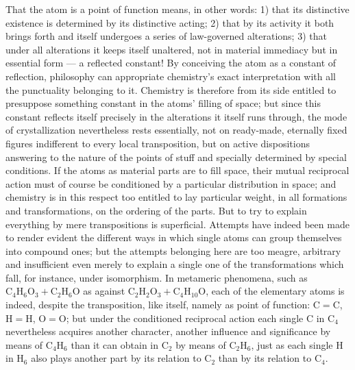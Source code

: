 \documentclass[12pt,a4paper]{book}
\begin{document}
That the atom is a point of function means, in other words: 1) that its
distinctive existence is determined by its distinctive acting; 2) that by its
activity it both brings forth and itself undergoes a series of law-governed
alterations; 3) that under all alterations it keeps itself unaltered, not in
material immediacy but in essential form --- a reflected constant! By
conceiving the atom as a constant of reflection, philosophy can appropriate
chemistry's exact interpretation with all the punctuality belonging to it.
Chemistry is therefore from its side entitled to presuppose something constant
in the atoms' filling of space; but since this constant reflects itself
precisely in the alterations it itself runs through, the mode of crystallization
nevertheless rests essentially, not on ready-made, eternally fixed figures
indifferent to every local transposition, but on active dispositions answering
to the nature of the points of stuff and specially determined by special
conditions. If the atoms as material parts are to fill space, their mutual
reciprocal action must of course be conditioned by a particular distribution in
space; and chemistry is in this respect too entitled to lay particular weight,
in all formations and transformations, on the ordering of the parts. But to try
to explain everything by mere transpositions is superficial. Attempts have
indeed been made to render evident the different ways in which single atoms can
group themselves into compound ones; but the attempts belonging here are too
meagre, arbitrary and insufficient even merely to explain a single one of the
transformations which fall, for instance, under isomorphism. In metameric
phenomena, such as
$\mathrm{C}_4\mathrm{H}_6\mathrm{O}_3 + \mathrm{C}_2\mathrm{H}_6\mathrm{O}$
as against
$\mathrm{C}_2\mathrm{H}_2\mathrm{O}_3 + \mathrm{C}_4\mathrm{H}_{10}\mathrm{O}$,
each of the elementary atoms is indeed, despite the transposition, like itself,
\setcounter{footnote}{0}
namely as point of function: $\mathrm{C} = \mathrm{C}$,
$\mathrm{H} = \mathrm{H}$, $\mathrm{O} = \mathrm{O}$; but under the conditioned
reciprocal action each single $\mathrm{C}$ in $\mathrm{C}_4$ nevertheless
acquires another character, another influence and significance by means of
$\mathrm{C}_4\mathrm{H}_6$ than it can obtain in $\mathrm{C}_2$ by means of
$\mathrm{C}_2\mathrm{H}_6$, just as each single $\mathrm{H}$ in $\mathrm{H}_6$
also plays another part by its relation to $\mathrm{C}_2$ than by its relation
to $\mathrm{C}_4$.
\end{document}
